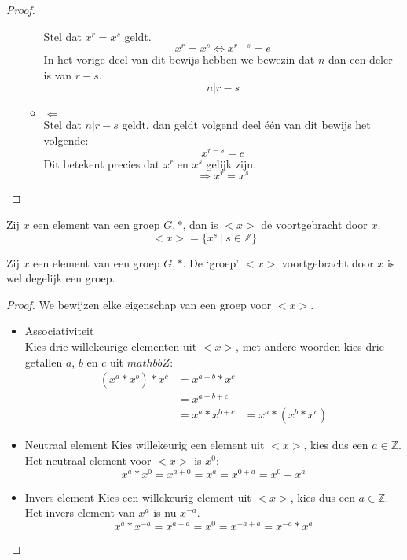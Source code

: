 \documentclass[main.tex]{subfiles}
\begin{document}
\begin{ei}
\begin{proof}
\begin{itemize}
\begin{itemize}
        Stel dat $x^{r} = x^{s}$ geldt.
        \[ x^{r} = x^{s} \Leftrightarrow x^{r-s} = e \]
        In het vorige deel van dit bewijs hebben we bewezin dat $n$ dan een deler is van $r-s$.
        \[ n|r-s \]
      \item $\Leftarrow$\\
        Stel dat $n | r-s$ geldt, dan geldt volgend deel \'e\'en van dit bewijs het volgende:
        \[ x^{r-s} = e \]
        Dit betekent precies dat $x^{r}$ en $x^{s}$ gelijk zijn.
        \[ \Rightarrow x^{r} = x^{s} \]
      \end{itemize}
    \end{itemize}
  \end{proof}
\end{ei}

\begin{de}
  Zij $x$ een element van een groep $G,*$, dan is $<x>$ de  voortgebracht door $x$.
  \[ <x> = \{ x^{s}\ |\ s \in \mathbb{Z} \} \]
\end{de}

\begin{st}
  \label{st:voortbrenging-is-groep}
  Zij $x$ een element van een groep $G,*$.
  De `groep' $<x>$ voortgebracht door $x$ is wel degelijk een groep.

  \begin{proof}
    We bewijzen elke eigenschap van een groep voor $<x>$.
    \begin{itemize}
    \item Associativiteit\\
      Kies drie willekeurige elementen uit $<x>$, met andere woorden kies drie getallen $a$, $b$ en $c$ uit $mathbb{Z}$:
      \[
      \begin{array}{rll}
      (x^{a} * x^{b})* x^{c} &= x^{a+b} * x^{c} &\\
                           &= x^{a+b+c}       &\\
                           &= x^{a} * x^{b+c} &= x^{a} * (x^{b} * x^{c})
      \end{array}
      \]
    \item Neutraal element
      Kies willekeurig een element uit $<x>$, kies dus een $a\in \mathbb{Z}$.
      Het neutraal element voor $<x>$ is $x^{0}$:
      \[ x^{a} * x^{0} = x^{a+0} = x^{a} = x^{0+a} = x^{0} + x^{a} \]
    \item Invers element
      Kies een willekeurig element uit $<x>$, kies dus een $a \in \mathbb{Z}$.
      Het invers element van $x^{a}$ is nu $x^{-a}$.
      \[ x^{a}*x^{-a} = x^{a-a} = x^{0} = x^{-a+a} = x^{-a} * x^{a} \]
    \end{itemize}
  \end{proof}

\end{st}
\end{document}
